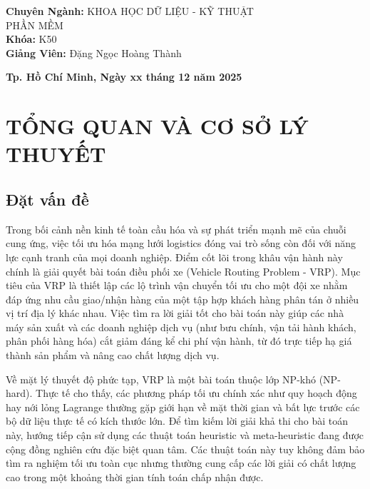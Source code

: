 \documentclass[12pt,a4paper]{article}
\numberwithin{figure}{subsection}
\begin{document}
\begin{titlepage}
\begin{flushleft}
\hspace{3.5cm} \textbf{Chuyên Ngành:} KHOA HỌC DỮ LIỆU - \textcolor{uehred}{KỸ THUẬT} \\[0.1cm]
\hspace{3.5cm} \textcolor{uehred}{PHẦN MỀM} \\[0.2cm]
\hspace{3.5cm} \textbf{Khóa:} \textcolor{uehred}{K50} \\[0.8cm]
\hspace{3.5cm} \textbf{Giảng Viên:} Đặng Ngọc Hoàng Thành
\end{flushleft}

\vfill

{\bfseries \small Tp. Hồ Chí Minh, Ngày xx tháng 12 năm 2025}

\end{titlepage}

\newpage
\tableofcontents
\thispagestyle{empty} 

\newpage
\pagestyle{plain}
\setcounter{page}{1}
\section{TỔNG QUAN VÀ CƠ SỞ LÝ THUYẾT}
\subsection{Đặt vấn đề}
Trong bối cảnh nền kinh tế toàn cầu hóa và sự phát triển mạnh mẽ của chuỗi cung ứng, việc tối ưu hóa mạng lưới logistics đóng vai trò sống còn đối với năng lực cạnh tranh của mọi doanh nghiệp. Điểm cốt lõi trong khâu vận hành này chính là giải quyết bài toán điều phối xe (Vehicle Routing Problem - VRP). Mục tiêu của VRP là thiết lập các lộ trình vận chuyển tối ưu cho một đội xe nhằm đáp ứng nhu cầu giao/nhận hàng của một tập hợp khách hàng phân tán ở nhiều vị trí địa lý khác nhau. Việc tìm ra lời giải tốt cho bài toán này giúp các nhà máy sản xuất và các doanh nghiệp dịch vụ (như bưu chính, vận tải hành khách, phân phối hàng hóa) cắt giảm đáng kể chi phí vận hành, từ đó trực tiếp hạ giá thành sản phẩm và nâng cao chất lượng dịch vụ.

Về mặt lý thuyết độ phức tạp, VRP là một bài toán thuộc lớp NP-khó (NP-hard). Thực tế cho thấy, các phương pháp tối ưu chính xác như quy hoạch động hay nới lỏng Lagrange thường gặp giới hạn về mặt thời gian và bất lực trước các bộ dữ liệu thực tế có kích thước lớn. Để tìm kiếm lời giải khả thi cho bài toán này, hướng tiếp cận sử dụng các thuật toán heuristic và meta-heuristic đang được cộng đồng nghiên cứu đặc biệt quan tâm. Các thuật toán này tuy không đảm bảo tìm ra nghiệm tối ưu toàn cục nhưng thường cung cấp các lời giải có chất lượng cao trong một khoảng thời gian tính toán chấp nhận được.
\end{document}
